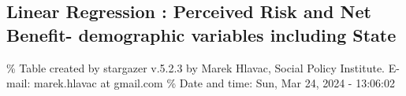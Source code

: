 \documentclass[
]{article}
\begin{document}
\begin{landscape}
\newpage

\hypertarget{linear-regression-perceived-risk-and-net-benefit--demographic-variables-including-state}{%
\subsection{Linear Regression : Perceived Risk and Net Benefit-
demographic variables including
State}\label{linear-regression-perceived-risk-and-net-benefit--demographic-variables-including-state}}

\begingroup\small\setlength{\tabcolsep}{1pt}

\renewcommand{\arraystretch}{0.7}

\% Table created by stargazer v.5.2.3 by Marek Hlavac, Social Policy
Institute. E-mail: marek.hlavac at gmail.com \% Date and time: Sun, Mar
24, 2024 - 13:06:02


\end{landscape}
\end{document}
